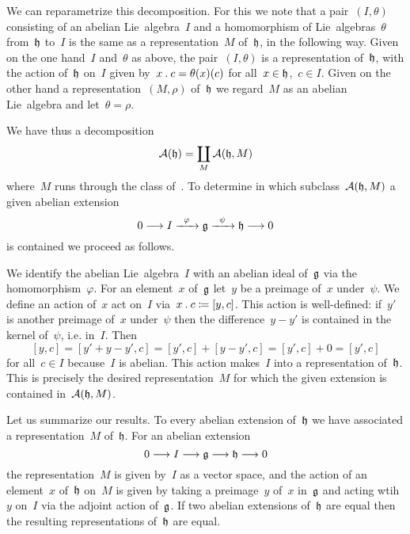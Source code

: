 \begin{fluff}
  We can reparametrize this decomposition.
  For this we note that a pair~$(I, \theta)$ consisting of an abelian Lie~algebra~$I$ and a homomorphism of Lie~algebras~$\theta$ from~$\mathfrak{h}$ to~$I$ is the same as a representation~$M$ of~$\mathfrak{h}$, in the following way.
  Given on the one hand~$I$ and~$\theta$ as above, the pair~$(I, \theta)$ is a representation of~$\mathfrak{h}$, with the action of~$\mathfrak{h}$ on~$I$ given by~$x \mathbin{.} c = \theta(x)(c)$ for all~$x \in \mathfrak{h}$,~$c \in I$.
  Given on the other hand a representation~$(M, \rho)$ of~$\mathfrak{h}$ we regard~$M$ as an abelian Lie~algebra and let~$\theta = \rho$.

  We have thus a decomposition
  \[
    \mathcal{A}(\mathfrak{h})
    =
    \coprod_M \mathcal{A}(\mathfrak{h}, M)
  \]
  where~$M$ runs through the class of~\representations{$\glie$}.
  To determine in which subclass~$\mathcal{A}(\mathfrak{h}, M)$ a given abelian extension
  \[
    0
    \to
    I
    \xto{\varphi}
    \glie
    \xto{\psi}
    \hlie
    \to
    0
  \]
  is contained we proceed as follows.

  We identify the abelian Lie~algebra~$I$ with an abelian ideal of~$\glie$ via the homomorphism~$\varphi$.
  For an element~$x$ of~$\glie$ let~$y$ be a preimage of~$x$ under~$\psi$.
  We define an action of~$x$ act on~$I$ via~$x \mathbin{.} c \coloneqq [y, c]$.
  This action is well-defined:
  if~$y'$ is another preimage of~$x$ under~$\psi$ then the difference~$y - y'$ is contained in the kernel of~$\psi$, i.e. in~$I$.
  Then
  \[
    [y, c]
    =
    [y' + y - y', c]
    =
    [y', c] + [y - y', c]
    =
    [y', c] + 0
    =
    [y', c]
  \]
  for all~$c \in I$ because~$I$ is abelian.
  This action makes~$I$ into a representation of~$\mathfrak{h}$.
  This is precisely the desired representation~$M$ for which the given extension is contained in~$\mathcal{A}(\mathfrak{h}, M)$.

  Let us summarize our results.
  To every abelian extension of~$\mathfrak{h}$ we have associated a representation~$M$ of~$\mathfrak{h}$.
  For an abelian extension
  \[
    0
    \to
    I
    \to
    \glie
    \to
    \hlie
    \to
    0
  \]
  the representation~$M$ is given by~$I$ as a vector space, and the action of an element~$x$ of~$\mathfrak{h}$ on~$M$ is given by taking a preimage~$y$ of~$x$ in~$\glie$ and acting wtih~$y$ on~$I$ via the adjoint action of~$\glie$.
  If two abelian extensions of~$\mathfrak{h}$ are equal then the resulting representations of~$\mathfrak{h}$ are equal.
\end{fluff}


